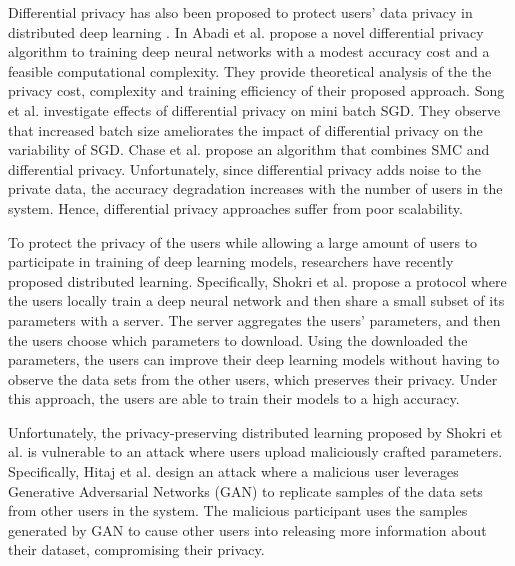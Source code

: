 \documentclass[conference]{IEEEtran}
\begin{document}
Differential privacy has also been proposed to protect users' data privacy  in distributed deep learning
\cite{vepakomma2018no}. 
In Abadi et al. \cite{abadi2016deep} propose a novel differential privacy algorithm to training deep neural networks with a modest
accuracy cost and a feasible computational complexity. They provide theoretical analysis of the the privacy cost, complexity and
training efficiency of their proposed approach. 
Song et al. \cite{song2013stochastic} investigate effects of differential privacy on mini batch SGD. They observe that increased batch
size ameliorates the impact of differential privacy on the variability of SGD. 
Chase et al. \cite{chase2017private} propose an algorithm that combines  SMC and differential privacy. 
Unfortunately, since differential privacy adds noise to the private data, the accuracy degradation increases with the number of users
in the system. Hence, differential privacy approaches suffer from poor scalability. 

To protect the privacy of the users while allowing a large amount of users to participate in training of deep learning
models, researchers have recently proposed distributed learning. Specifically, Shokri et al. \cite{shokri2015privacy} propose 
a protocol where the users locally train a deep neural network and then share a small subset of its parameters
with a server. The server aggregates the users' parameters, and then the users choose which parameters to download. 
Using the downloaded the parameters, the users can improve their deep learning models without having to observe the data sets from the
other users, which preserves their privacy. Under this approach, the users are able to train their models to a high accuracy. 

Unfortunately, the privacy-preserving distributed learning proposed by Shokri et al. \cite{shokri2015privacy} is vulnerable to an
attack where users upload maliciously crafted parameters. Specifically, Hitaj  et al. \cite{hitaj2017deep} design
an attack where a malicious user 
leverages Generative Adversarial Networks (GAN) to replicate samples of the data sets from other users in the system. The malicious participant uses the samples generated by GAN to cause other users into releasing more information about their dataset, compromising their privacy.
\end{document}
